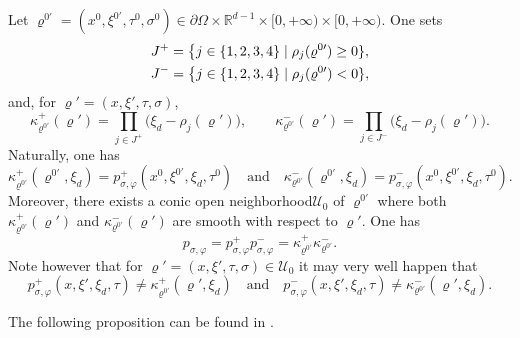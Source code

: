 \documentclass[JEP,XML,SOM,Unicode,published]{cedram}
\newcommand{\quand}{\quad\text{and}\quad}
\let\sep\mid
\theoremstyle{plain}
\theoremstyle{definition}
\def\R{\mathbb{R}}
\newcommand{\nhd}{neighborhood\xspace}
\let\k\kappa
\let\y\varrho
\let \Im \relax
\DeclareMathOperator{\Im}{Im}
\newcommand{\U}{\mathscr U}
\newcommand{\pconj}{p_{\sigma,\varphi}}
\begin{document}
Let $\y^{0\prime} = (x^0, \xi^{0\prime}, \tau^0, \sigma^0)\in \partial
\Omega \times \R^{d-1}\times [0,+\infty) \times [0,+\infty)$.
One sets
\begin{align*}
&J^+= \big\{ j \in \{1,2,3,4\}\sep \Im \rho_j (\y^{0\prime}) \geq 0\}, \\
&J^-= \big\{ j \in \{1,2,3,4\}\sep \Im \rho_j (\y^{0\prime}) < 0\},
\end{align*}
and, for $\y' = (x,\xi', \tau,\sigma)$,
\begin{equation*}
\k^+_{\y^{0\prime}} (\y')
= \prod_{j \in J^+} \big(\xi_d -\rho_j(\y')\big),
\qquad
\k^-_{\y^{0\prime}} (\y')
= \prod_{j \in J^-} \big(\xi_d -\rho_j(\y')\big).
\end{equation*}
Naturally, one has
\[
\k^+_{\y^{0\prime}} (\y^{0\prime},\xi_d) = \pconj^+(x^0,
\xi^{0\prime}, \xi_d, \tau^0)\quand\k^-_{\y^{0\prime}} (\y^{0\prime},\xi_d) = \pconj^-(x^0,
\xi^{0\prime}, \xi_d, \tau^0).
\]
Moreover, there exists a conic open \nhd $\U_0$ of
$\y^{0\prime}$ where both $\k^+_{\y^{0\prime}}(\y')$ and
$\k^-_{\y^{0\prime}}(\y')$ are smooth with respect to $\y'$.
One has
\begin{equation*}
\pconj = \pconj^+ \pconj^-
= \k^+_{\y^{0\prime}} \k^-_{\y^{0\prime}} .
\end{equation*}
Note however that for $\y' = (x,\xi',\tau,\sigma) \in \U_0$ it may very well happen that
\[
\pconj^+(x,\xi', \xi_d, \tau) \neq \k^+_{\y^{0\prime}} (\y',\xi_d)\quand \pconj^-(x,\xi', \xi_d, \tau) \neq \k^-_{\y^{0\prime}} (\y',\xi_d).
\]

The following proposition can be found in \cite[Prop.\,1.8]{ML}.
\end{document}
